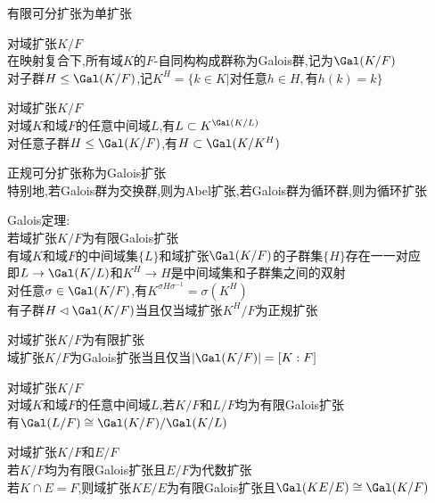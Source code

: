 \begin{dingli}
有限可分扩张为单扩张
\end{dingli}

\begin{dingyi}
对域扩张$K/F$\\
在映射复合下,所有域$K$的$F$-自同构构成群称为Galois群,记为$\Gal(K/F)$\\
对子群$H\leq \Gal(K/F)$,记$K^{H}=\{k\in K|\text{对任意}h\in H,\text{有}h(k)=k\}$
\end{dingyi}

\begin{dingli}
对域扩张$K/F$\\
对域$K$和域$F$的任意中间域$L$,有$L\subset K^{\Gal(K/L)}$\\
对任意子群$H\leq \Gal(K/F)$,有$H\subset\Gal(K/K^{H})$
\end{dingli}

\begin{dingyi}
正规可分扩张称为Galois扩张\\
特别地,若Galois群为交换群,则为Abel扩张,若Galois群为循环群,则为循环扩张
\end{dingyi}

\begin{dingyi}
Galois定理:\\
若域扩张$K/F$为有限Galois扩张\\
有域$K$和域$F$的中间域集$\{L\}$和域扩张$\Gal(K/F)$的子群集$\{H\}$存在一一对应\\
即$L\to \Gal(K/L)$和$K^{H}\to H$是中间域集和子群集之间的双射\\
对任意$\sigma \in \Gal(K/F)$,有$K^{\sigma H\sigma^{-1}}=\sigma (K^{H})$\\
有子群$H\lhd \Gal(K/F)$当且仅当域扩张$K^{H}/F$为正规扩张
\end{dingyi}

\begin{dingli}
对域扩张$K/F$为有限扩张\\
域扩张$K/F$为Galois扩张当且仅当$|\Gal(K/F)|=[K:F]$
\end{dingli}

\begin{dingli}
对域扩张$K/F$\\
对域$K$和域$F$的任意中间域$L$,若$K/F$和$L/F$均为有限Galois扩张\\
有$\Gal(L/F)\cong\Gal(K/F)/\Gal(K/L)$
\end{dingli}

\begin{dingli}
对域扩张$K/F$和$E/F$\\
若$K/F$均为有限Galois扩张且$E/F$为代数扩张\\
若$K\cap E=F$,则域扩张$KE/E$为有限Galois扩张且$\Gal(KE/E)\cong\Gal(K/F)$
\end{dingli}

%